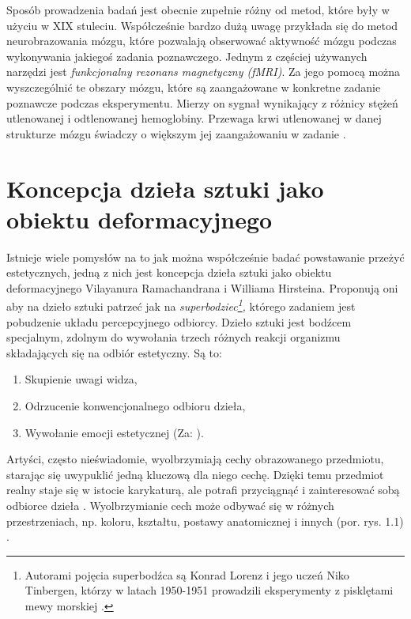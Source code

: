 \documentclass[licencjacka]{kdypl}
\begin{document}
Sposób prowadzenia badań jest obecnie zupełnie różny od metod, które były w użyciu w XIX stuleciu. Współcześnie bardzo dużą uwagę przykłada się do metod neurobrazowania mózgu, które pozwalają obserwować aktywność mózgu podczas wykonywania jakiegoś zadania poznawczego. Jednym z częściej używanych narzędzi jest \textit{funkcjonalny rezonans magnetyczny (fMRI)}. Za jego pomocą można wyszczególnić te obszary mózgu, które są zaangażowane w konkretne zadanie poznawcze podczas eksperymentu. Mierzy on sygnał wynikający z  różnicy stężeń utlenowanej i odtlenowanej hemoglobiny. Przewaga krwi utlenowanej w danej strukturze mózgu świadczy o większym jej zaangażowaniu w zadanie \citep[s. 55]{Jaskowski}.
\section{Koncepcja dzieła sztuki jako obiektu deformacyjnego}

Istnieje wiele pomysłów na to jak można współcześnie badać powstawanie przeżyć estetycznych, jedną z nich jest koncepcja dzieła sztuki jako obiektu deformacyjnego Vilayanura Ramachandrana i Williama Hirsteina. Proponują oni aby na dzieło sztuki patrzeć jak na \textit{superbodziec\footnote{Autorami pojęcia superbodźca są Konrad Lorenz i jego uczeń Niko Tinbergen, którzy w latach 1950-1951 prowadzili eksperymenty z pisklętami mewy morskiej \citep{tinbergen}.},} którego zadaniem jest pobudzenie układu percepcyjnego odbiorcy. Dzieło sztuki jest bodźcem specjalnym, zdolnym do wywołania trzech różnych reakcji organizmu składających się na odbiór estetyczny. Są to:
\begin{enumerate}
\item Skupienie uwagi widza,
\item Odrzucenie konwencjonalnego odbioru dzieła,
\item Wywołanie emocji estetycznej
(Za: \citealt[s. 370]{Przybysz2006}).
\end{enumerate}

Artyści, często nieświadomie, wyolbrzymiają cechy obrazowanego przedmiotu, starając się uwypuklić jedną kluczową dla niego cechę. Dzięki temu przedmiot realny staje się w istocie karykaturą, ale  potrafi przyciągnąć i zainteresować sobą odbiorce dzieła \citep[s. 333]{Rama}.
Wyolbrzymianie cech może odbywać się w różnych przestrzeniach, np. koloru, kształtu, postawy anatomicznej i innych (por. rys. 1.1) \citep[s. 333-335]{Rama}.
\end{document}
